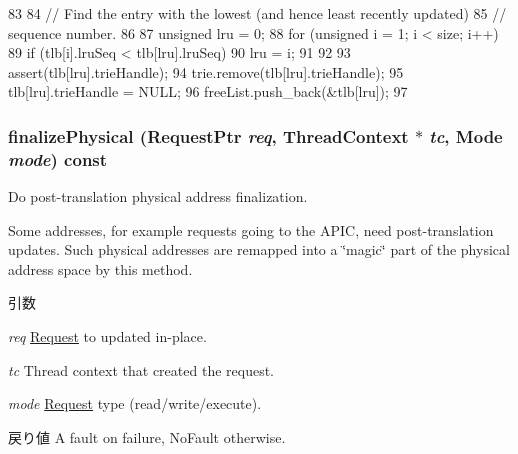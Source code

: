 \begin{DoxyCode}
83 {
84     // Find the entry with the lowest (and hence least recently updated)
85     // sequence number.
86 
87     unsigned lru = 0;
88     for (unsigned i = 1; i < size; i++) {
89         if (tlb[i].lruSeq < tlb[lru].lruSeq)
90             lru = i;
91     }
92 
93     assert(tlb[lru].trieHandle);
94     trie.remove(tlb[lru].trieHandle);
95     tlb[lru].trieHandle = NULL;
96     freeList.push_back(&tlb[lru]);
97 }
\end{DoxyCode}
\hypertarget{classX86ISA_1_1TLB_ae199d95c42e036851a8a0543c6d6d2e3}{
\subsubsection[{finalizePhysical}]{ finalizePhysical ({\bf RequestPtr} {\em req}, \/  {\bf ThreadContext} $\ast$ {\em tc}, \/  {\bf Mode} {\em mode}) const}}
\label{classX86ISA_1_1TLB_ae199d95c42e036851a8a0543c6d6d2e3}
Do post-\/translation physical address finalization.

Some addresses, for example requests going to the APIC, need post-\/translation updates. Such physical addresses are remapped into a \char`\"{}magic\char`\"{} part of the physical address space by this method.


\begin{DoxyParams}{引数}
\item[{\em req}]\hyperlink{classRequest}{Request} to updated in-\/place. \item[{\em tc}]Thread context that created the request. \item[{\em mode}]\hyperlink{classRequest}{Request} type (read/write/execute). \end{DoxyParams}
\begin{DoxyReturn}{戻り値}
A fault on failure, NoFault otherwise. 
\end{DoxyReturn}



